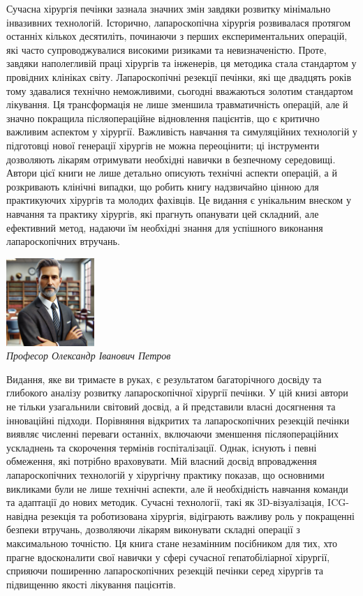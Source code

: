 \newpage

Сучасна хірургія печінки зазнала значних змін завдяки розвитку мінімально інвазивних технологій. Історично, лапароскопічна хірургія розвивалася протягом останніх кількох десятиліть, починаючи з перших експериментальних операцій, які часто супроводжувалися високими ризиками та невизначеністю. Проте, завдяки наполегливій праці хірургів та інженерів, ця методика стала стандартом у провідних клініках світу. Лапароскопічні резекції печінки, які ще двадцять років тому здавалися технічно неможливими, сьогодні вважаються золотим стандартом лікування. Ця трансформація не лише зменшила травматичність операцій, але й значно покращила післяопераційне відновлення пацієнтів, що є критично важливим аспектом у хірургії. Важливість навчання та симуляційних технологій у підготовці нової генерації хірургів не можна переоцінити; ці інструменти дозволяють лікарям отримувати необхідні навички в безпечному середовищі. Автори цієї книги не лише детально описують технічні аспекти операцій, а й розкривають клінічні випадки, що робить книгу надзвичайно цінною для практикуючих хірургів та молодих фахівців. Це видання є унікальним внеском у навчання та практику хірургів, які прагнуть опанувати цей складний, але ефективний метод, надаючи їм необхідні знання для успішного виконання лапароскопічних втручань.

\begin{flushright}
    \includegraphics[width=0.25\textwidth]{Illustrations/Preface/image1.png} \\
    \textit{Професор Олександр Іванович Петров}
\end{flushright}

\newpage

Видання, яке ви тримаєте в руках, є результатом багаторічного досвіду та глибокого аналізу розвитку лапароскопічної хірургії печінки. У цій книзі автори не тільки узагальнили світовий досвід, а й представили власні досягнення та інноваційні підходи. Порівняння відкритих та лапароскопічних резекцій печінки виявляє численні переваги останніх, включаючи зменшення післяопераційних ускладнень та скорочення термінів госпіталізації. Однак, існують і певні обмеження, які потрібно враховувати. Мій власний досвід впровадження лапароскопічних технологій у хірургічну практику показав, що основними викликами були не лише технічні аспекти, але й необхідність навчання команди та адаптації до нових методик. Сучасні технології, такі як 3D-візуалізація, ICG-навідна резекція та роботизована хірургія, відіграють важливу роль у покращенні безпеки втручань, дозволяючи лікарям виконувати складні операції з максимальною точністю. Ця книга стане незамінним посібником для тих, хто прагне вдосконалити свої навички у сфері сучасної гепатобіліарної хірургії, сприяючи поширенню лапароскопічних резекцій печінки серед хірургів та підвищенню якості лікування пацієнтів.

